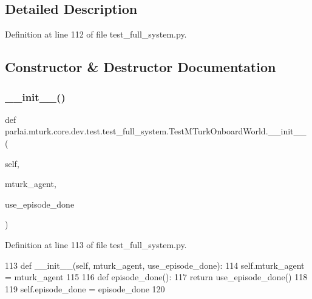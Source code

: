 \subsection{Detailed Description}


Definition at line 112 of file test\+\_\+full\+\_\+system.\+py.



\subsection{Constructor \& Destructor Documentation}
\mbox{\label{classparlai_1_1mturk_1_1core_1_1dev_1_1test_1_1test__full__system_1_1TestMTurkOnboardWorld_a4488b20bd652972be39ed450e41cc5ff}} 
\subsubsection{\texorpdfstring{\+\_\+\+\_\+init\+\_\+\+\_\+()}{\_\_init\_\_()}}
{\footnotesize\ttfamily def parlai.\+mturk.\+core.\+dev.\+test.\+test\+\_\+full\+\_\+system.\+Test\+M\+Turk\+Onboard\+World.\+\_\+\+\_\+init\+\_\+\+\_\+ (\begin{DoxyParamCaption}\item[{}]{self,  }\item[{}]{mturk\+\_\+agent,  }\item[{}]{use\+\_\+episode\+\_\+done }\end{DoxyParamCaption})}



Definition at line 113 of file test\+\_\+full\+\_\+system.\+py.


\begin{DoxyCode}
113     \textcolor{keyword}{def }\_\_init\_\_(self, mturk\_agent, use\_episode\_done):
114         self.mturk\_agent = mturk\_agent
115 
116         \textcolor{keyword}{def }episode\_done():
117             \textcolor{keywordflow}{return} use\_episode\_done()
118 
119         self.episode\_done = episode\_done
120 
\end{DoxyCode}


